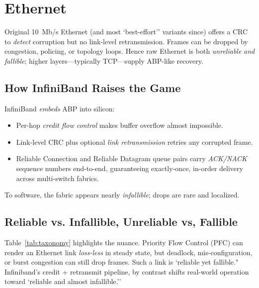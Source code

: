 \documentclass[../../../OAE-SPEC-MAIN.tex]{subfiles}
\begin{document}
\section{Ethernet}


Original 10~Mb/s Ethernet (and most `best-effort'' variants since) offers a
CRC to \emph{detect} corruption but no link-level
retransmission. Frames can be dropped by congestion, policing, or topology
loops. Hence raw Ethernet is both \emph{unreliable} \emph{and} \emph{fallible};
higher layers---typically TCP---supply ABP-like recovery.


\subsection{How InfiniBand Raises the Game}

InfiniBand \emph{embeds} ABP into silicon:

\begin{itemize}
\item Per-hop \emph{credit flow control} makes buffer overflow almost
      impossible.
\item Link-level CRC plus optional \emph{link retransmission} retries any
      corrupted frame.
\item Reliable Connection and Reliable Datagram queue pairs carry
      \emph{ACK/NACK} sequence numbers end-to-end, guaranteeing exactly-once,
      in-order delivery across multi-switch fabrics.
\end{itemize}

To software, the fabric appears nearly \emph{infallible}; drops are rare and localized.


\subsection{Reliable vs. Infallible, Unreliable vs, Fallible}

Table~\ref{tab:taxonomy} highlights the nuance.  Priority Flow Control (PFC)
can render an Ethernet link \emph{loss-less} in steady state, but deadlock,
mis-configuration, or burst congestion can still drop frames.  Such a link is
`reliable yet fallible." Infiniband's credit + retransmit pipeline, by contrast
shifts real-world operation toward `reliable and almost infallible.''
\end{document}
